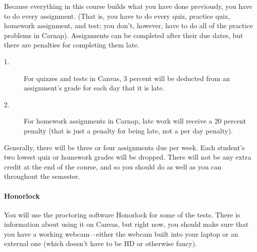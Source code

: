 \documentclass[11pt,oneside]{article}
\begin{document}
Because everything in this course builds what you have done previously, you have to do every assignment. (That is, you have to do every quiz, practice quiz, homework assignment, and test; you don’t, however, have to do all of the practice problems in Carnap). Assignments can be completed after their due dates, but there are penalties for completing them late. 
\begin{description}
\item[1.] For quizzes and tests in Canvas, 3 percent will be deducted from an assignment's grade for each day that it is late. 
\item[2.] For homework assignments in Carnap, late work will receive a 20 percent penalty (that is just a penalty for being late, not a per day penalty). 
\end{description}
Generally, there will be three or four assignments due per week. Each student's two lowest quiz or homework grades will be dropped. There will not be any extra credit at the end of the course, and so you should do as well as you can throughout the semester.

\paragraph{Honorlock} You will use the proctoring software Honorlock for some of the tests. There is information about using it on Canvas, but right now, you should make sure that you have a working webcam---either the webcam built into your laptop or an external one (which doesn't have to be HD or otherwise fancy).
\end{document}
